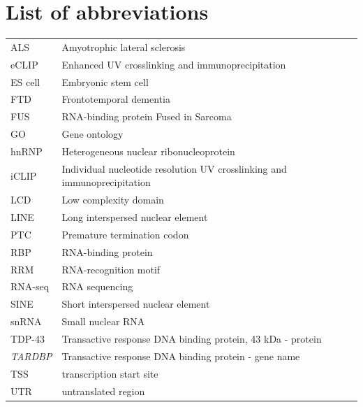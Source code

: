 \section*{\LARGE{List of abbreviations}}
\begin{table}[h!]
	\begin{tabular}{ll}
		ALS & Amyotrophic lateral sclerosis \\
		eCLIP & Enhanced UV crosslinking and immunoprecipitation \\
		ES cell & Embryonic stem cell \\
		FTD	& Frontotemporal dementia \\
		FUS & RNA-binding protein Fused in Sarcoma \\
		GO & Gene ontology \\
		hnRNP &	Heterogeneous nuclear ribonucleoprotein\\
		iCLIP & Individual nucleotide resolution UV crosslinking and immunoprecipitation \\
		LCD & Low complexity domain \\
		LINE & Long interspersed nuclear element \\
		PTC	& Premature termination codon \\
		RBP & RNA-binding protein \\
		RRM & RNA-recognition motif \\
		RNA-seq & RNA sequencing \\
		SINE & Short interspersed nuclear element \\
		snRNA & Small nuclear RNA \\
		TDP-43 & Transactive response DNA binding protein, 43 kDa - protein \\
		\textit{TARDBP} & Transactive response DNA binding protein - gene name \\
		TSS & transcription start site \\
		UTR & untranslated region \\
	\end{tabular}
\end{table}
\clearpage
